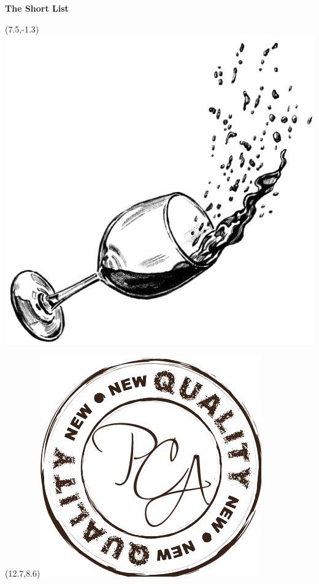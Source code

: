 \documentclass{article}
\makeatletter
\newcommand \Dotfill {\leavevmode \cleaders \hb@xt@ .25em{\hss .\hss }\hfill \kern \z@}%
\makeatother
\begin{document}
	

\makebox[\columnwidth]{\Huge\Dotfill}\centering\begin{spacing}{.4}{\Huge\color{BrickRed}\textbf{The Short List}}\end{spacing}
\makebox[\columnwidth]{\Huge\Dotfill}

\begin{textblock}{1}(7.5,-1.3)\includegraphics{wine.png}\end{textblock}
\begin{textblock}{1}(12.7,8.6)\includegraphics[scale=.15]{stamp.png}\end{textblock}
\end{document}
